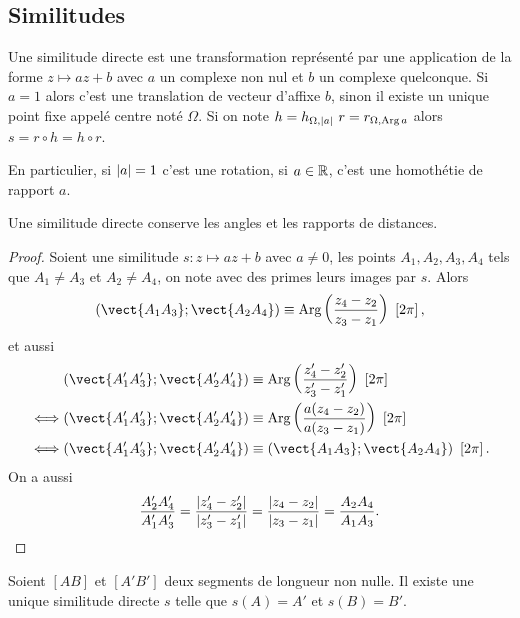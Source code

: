 \subsection{Similitudes}

Une similitude directe est une transformation représenté par une application de la forme $z \longmapsto az+b$ avec $a$ un complexe non nul et $b$ un complexe quelconque. Si $a=1$ alors c'est une translation de vecteur d'affixe $b$, sinon il existe un unique point fixe appelé centre noté $\Omega$. Si on note $h=h_{\Omega, \abs{a}} \ r=r_{\Omega, \Arg{a}}$ alors $s=r \circ h=h \circ r$.

En particulier, si $\left\lvert a\right\rvert=1$ c'est une rotation, si $a \in \mathbb{R}$, c'est une homothétie de rapport $a$.

\begin{prop}
  Une similitude directe conserve les angles et les rapports de distances.
\end{prop}
\begin{proof}
  Soient une similitude $s : z \longmapsto az+b$ avec $a \neq 0$, les points $A_1,A_2,A_3,A_4$ tels que $A_1 \neq A_3$ et $A_2 \neq A_4$, on note avec des primes leurs images par $s$. Alors
  \begin{equation}
    \congru{(\vect{A_1 A_3};\vect{A_2 A_4})}{\Arg\left(\frac{z_4-z_2}{z_3-z_1}\right)}{2\pi},
  \end{equation}
et aussi
\begin{align}
    &\congru{(\vect{A'_1 A'_3};\vect{A'_2 A'_4})}{\Arg\left(\frac{z'_4-z'_2}{z'_3-z'_1}\right)}{2\pi}\\
    \iff&\congru{(\vect{A'_1 A'_3};\vect{A'_2 A'_4})}{\Arg\left(\frac{a(z_4-z_2)}{a(z_3-z_1)}\right)}{2\pi}\\
    \iff&\congru{(\vect{A'_1 A'_3};\vect{A'_2 A'_4})}{(\vect{A_1 A_3};\vect{A_2 A_4})}{2\pi}.
  \end{align}
  On a aussi
\begin{equation}
  \frac{A'_2A'_4}{A'_1A'_3}=\frac{\left\lvert z'_4-z'_2\right\rvert}{\left\lvert z'_3-z'_1\right\rvert}=\frac{\left\lvert z_4-z_2\right\rvert}{\left\lvert z_3-z_1\right\rvert}=\frac{A_2A_4}{A_1A_3}.
\end{equation}
\end{proof}

\begin{prop}
  Soient $[AB]$ et $[A'B']$ deux segments de longueur non nulle. Il existe une unique similitude directe $s$ telle que $s(A)=A'$ et $s(B)=B'$.
\end{prop}
